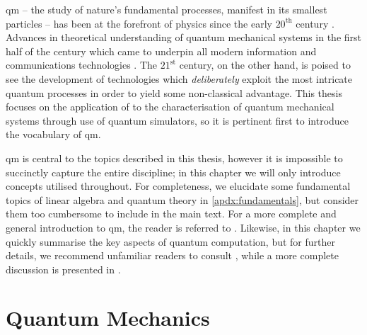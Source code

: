 \Gls{qm} -- the study of nature's fundamental processes, manifest in its smallest particles --
    has been at the forefront of physics since the early $20^{\textrm{th}}$ century \cite{jammer1966conceptual}.
Advances in theoretical understanding of quantum mechanical systems in the first half of the century 
    \cite{einstein1905heuristic, born1926quantenmechanik, schrodinger1926undulatory, heisenberg1985quantentheoretische, von2018mathematical}
    which came to underpin all modern information and communications technologies 
    \cite{svelto2010principles, van2004principles}.
The $21^{\textrm{st}}$ century, on the other hand, is poised to see the development of 
    technologies which \emph{deliberately} exploit the most intricate quantum processes in order to yield 
    some non-classical advantage. 
This thesis focuses on the application of  to the characterisation of quantum mechanical systems
    through use of quantum simulators, 
    so it is pertinent first to introduce the vocabulary of \gls{qm}. 
\par 

\Gls{qm} is central to the topics described in this thesis, 
    however it is impossible to succinctly capture the entire discipline; 
    in this chapter we will only introduce concepts utilised throughout.
For completeness, we elucidate some fundamental topics of linear algebra and quantum theory in \cref{apdx:fundamentals},
    but consider them too cumbersome to include in the main text. 
For a more complete and general introduction to \gls{qm}, the reader is referred to \cite{griffiths2018introduction, susskind2014quantum}.
Likewise, in this chapter we quickly summarise the key aspects of quantum computation, 
    but for further details, we recommend unfamiliar readers to consult \cite{rieffel2011quantum}, 
    while a more complete discussion is presented in \cite{nielsen2002quantum}.

\section{Quantum Mechanics}\label{sec:qm}

